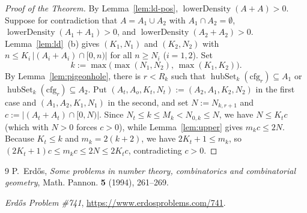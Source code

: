 \documentclass[11pt,a4paper]{amsart}
\newcommand{\hubSet}{\operatorname{hubSet}}
\newcommand{\lowerDensity}{\operatorname{lowerDensity}}
\begin{document}
\begin{proof}[Proof of the Theorem]
By Lemma~\ref{lem:ld-pos}, $\lowerDensity(A + A) > 0$. Suppose for contradiction that $A = A_1 \cup A_2$ with $A_1 \cap A_2 = \emptyset$, $\lowerDensity(A_1 + A_1) > 0$, and $\lowerDensity(A_2 + A_2) > 0$. Lemma~\ref{lem:ld}~(b) gives $(K_1, N_1)$ and $(K_2, N_2)$ with $n \le K_i \, |(A_i + A_i) \cap [0, n)|$ for all $n \ge N_i$ ($i = 1, 2$). Set
\[
k := \max\bigl(\max(N_1, N_2),\, \max(K_1, K_2)\bigr).
\]
By Lemma~\ref{lem:pigeonhole}, there is $r < R_k$ such that $\hubSet_k(\mathrm{cfg}_r) \subseteq A_1$ or $\hubSet_k(\mathrm{cfg}_r) \subseteq A_2$. Put $(A_t, A_o, K_t, N_t) := (A_2, A_1, K_2, N_2)$ in the first case and $(A_1, A_2, K_1, N_1)$ in the second, and set $N := N_{k,r+1}$ and $c := |(A_t + A_t) \cap [0, N)|$. Since $N_t \le k \le M_k < N_{0,k} \le N$, we have $N \le K_t c$ (which with $N > 0$ forces $c > 0$), while Lemma~\ref{lem:upper} gives $m_k c \le 2 N$. Because $K_t \le k$ and $m_k = 2(k + 2)$, we have $2 K_t + 1 \le m_k$, so $(2 K_t + 1) c \le m_k c \le 2 N \le 2 K_t c$, contradicting $c > 0$.
\end{proof}

\begin{thebibliography}{9}
P.~Erd\H{o}s, \emph{Some problems in number theory, combinatorics and combinatorial geometry}, Math. Pannon. \textbf{5} (1994), 261--269.

\emph{Erd\H{o}s Problem \#741}, \url{https://www.erdosproblems.com/741}.
\end{thebibliography}
\end{document}

